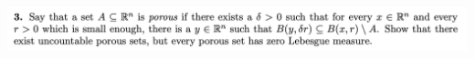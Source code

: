 








\newpage
\begin{mdframed}
  \includegraphics[width=400pt]{img/analysis--berkeley-202a-final-ef68.png}
\end{mdframed}


